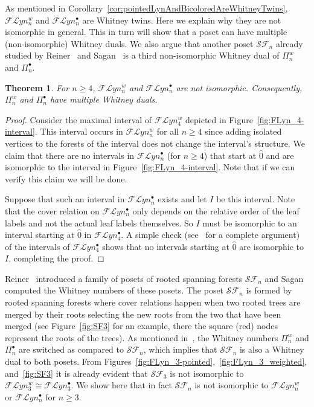 \documentclass[11pt]{article}
\newtheorem{theo}{Theorem}[section]
\theoremstyle{definition}
\numberwithin{equation}{section}
\newcommand{\Flyn}{\mathcal{FL}yn}
\newcommand{\SF}{\mathcal{SF}}
\begin{document}
As mentioned in Corollary~\ref{cor:pointedLynAndBicoloredAreWhitneyTwins}, $\Flyn_{n}^{w}$ and  $\Flyn_{n}^{\bullet}$ are Whitney twins.  Here we explain why they are not isomorphic in general.  This in turn will show that a poset can have multiple (non-isomorphic) Whitney duals. We also argue that another poset $\SF_n$ already studied by Reiner~\cite{Reiner1978} and Sagan~\cite{Sagan1983} is a third non-isomorphic Whitney dual of $\Pi_n^w$ and $\Pi_n^{\bullet}$.

\begin{theo}\label{thm:nonIsomorphicWDual}
  For $n\geq4$, $\Flyn_{n}^{w}$ and  $\Flyn_{n}^{\bullet}$ are not isomorphic. Consequently, $\Pi_n^w$ and $\Pi_n^\bullet$ have multiple Whitney duals.
\end{theo}
   \begin{proof}
   Consider the maximal interval of $\Flyn_{4}^{w}$ depicted in Figure~\ref{fig:FLyn_4-interval}. This interval occurs in $\Flyn_{n}^{w}$ for all $n\geq 4$ since adding isolated vertices to the forests of the interval does not change the interval's structure.  We claim that  there are no   intervals in $\Flyn_{n}^{\bullet}$ (for $n\geq 4$) that start at $\hat{0}$ and are isomorphic to the interval in Figure~\ref{fig:FLyn_4-interval}.  Note that if we can verify this claim we will be done.  
   
   Suppose that such an  interval in $\Flyn_{n}^{\bullet}$  exists and let $I$ be this interval. Note that the cover relation on $\Flyn_{n}^{\bullet}$ only depends on the relative order of the leaf labels and not the actual leaf labels themselves. So $I$ must be isomorphic to an interval starting at $\hat{0}$ in $\Flyn_{4}^{\bullet}$. A simple check (see~\cite[Theorem 3.3.4]{QuicenoDuran2020} for a complete argument) of the intervals of $\Flyn_{4}^{\bullet}$ shows that no intervals starting at $\hat{0}$ are isomorphic to $I$, completing the proof.
  \end{proof}
  
 Reiner~\cite{Reiner1978}  introduced a family of posets of rooted spanning forests $\SF_n$ and  Sagan~\cite{Sagan1983} computed the Whitney numbers of these posets. The poset  $\SF_n$  is formed by rooted spanning forests where cover relations happen when two rooted trees are merged by their roots selecting the new roots from the two that have been merged (see Figure~\ref{fig:SF3} for an example, there the square (red) nodes represent the roots of the trees). 
 As mentioned in~\cite{GonzalezDleonWachs2016}, the Whitney numbers $\Pi_n^w$ and $\Pi_n^{\bullet}$ are switched as compared to $\SF_n$, which implies that $\SF_n$ is also a Whitney dual to both posets.  From Figures~\ref{fig:FLyn_3-pointed},~\ref{fig:FLyn_3_weighted}, and~\ref{fig:SF3} it is already evident that $\SF_3$ is not isomorphic to $\Flyn_{3}^{w}\cong \Flyn_{3}^{\bullet}$. We show here that in fact $\SF_n$ is not isomorphic to $\Flyn_{n}^{w}$ or $\Flyn_{n}^{\bullet}$ for $n\ge 3$.  
\end{document}
